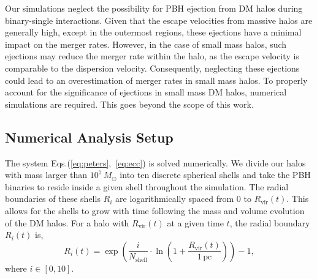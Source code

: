 \documentclass[aps, prd, reprint, nofootinbib]{revtex4-2}
\begin{document}
Our simulations neglect the possibility for PBH ejection from DM halos during binary-single interactions. Given that the escape velocities from massive halos are generally high, except in the outermost regions, these ejections have a minimal impact on the merger rates. However, in the case of small mass halos, such ejections may reduce the merger rate within the halo, as the escape velocity is comparable to the dispersion velocity. Consequently, neglecting these ejections could lead to an overestimation of merger rates in small mass halos.
To properly account for the significance of ejections in small mass DM halos, numerical simulations are required. This goes beyond the scope of this work. 

\subsection{Numerical Analysis Setup}
\label{subsec:numerical_setup_binary_single}
The system Eqs.(\ref{eq:peters},~\ref{eq:ecc}) is solved numerically. 
We divide our halos with mass larger than $10^{7} \, M_{\odot}$ into ten discrete spherical shells and take the PBH binaries to reside inside 
a given shell throughout the simulation.
The radial boundaries of these shells $R_i$ are logarithmically spaced from $0$ to $R_{\textrm{vir}}(t)$.
This allows for the shells to grow with time following the mass and volume evolution of the DM halos.
For a halo with $R_{\textrm{vir}}(t)$ at a given time $t$, the radial boundary $R_{i}(t)$ is,
\begin{equation}
\label{R_I}
R_{i}(t) = \exp\left( \frac{i}{N_{\textrm{shell}}} \cdot \ln \left(1 + \frac{R_{\textrm{vir}}(t)}{1 \, \textrm{pc}}\right) \right) - 1,
\end{equation}
where $i \in [0,10]$.
\end{document}
